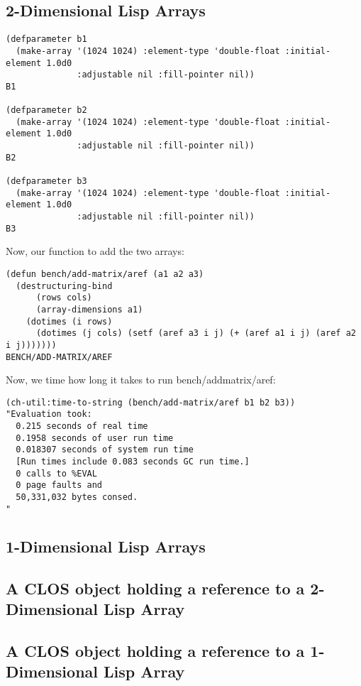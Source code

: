\documentclass[10pt]{article}
\begin{document}
\baselineskip12pt
\subsection{2-Dimensional Lisp Arrays}
\baselineskip14pt

\baselineskip12pt
\begin{verbatim}(defparameter b1
  (make-array '(1024 1024) :element-type 'double-float :initial-element 1.0d0
              :adjustable nil :fill-pointer nil))
B1

(defparameter b2
  (make-array '(1024 1024) :element-type 'double-float :initial-element 1.0d0
              :adjustable nil :fill-pointer nil))
B2

(defparameter b3
  (make-array '(1024 1024) :element-type 'double-float :initial-element 1.0d0
              :adjustable nil :fill-pointer nil))
B3

\end{verbatim}
\baselineskip14pt
Now, our function to add the two arrays:


\baselineskip12pt
\begin{verbatim}(defun bench/add-matrix/aref (a1 a2 a3)
  (destructuring-bind
      (rows cols)
      (array-dimensions a1)
    (dotimes (i rows)
      (dotimes (j cols) (setf (aref a3 i j) (+ (aref a1 i j) (aref a2 i j)))))))
BENCH/ADD-MATRIX/AREF

\end{verbatim}
\baselineskip14pt
Now, we time how long it takes to run bench/addmatrix/aref:


\baselineskip12pt
\begin{verbatim}(ch-util:time-to-string (bench/add-matrix/aref b1 b2 b3))
"Evaluation took:
  0.215 seconds of real time
  0.1958 seconds of user run time
  0.018307 seconds of system run time
  [Run times include 0.083 seconds GC run time.]
  0 calls to %EVAL
  0 page faults and
  50,331,032 bytes consed.
"

\end{verbatim}
\baselineskip14pt
\baselineskip12pt
\subsection{1-Dimensional Lisp Arrays}
\baselineskip14pt
\baselineskip12pt
\subsection{A CLOS object holding a reference to a 2-Dimensional Lisp
 Array}
\baselineskip14pt
\baselineskip12pt
\subsection{A CLOS object holding a reference to a 1-Dimensional Lisp
 Array}
\baselineskip14pt
\end{document}
